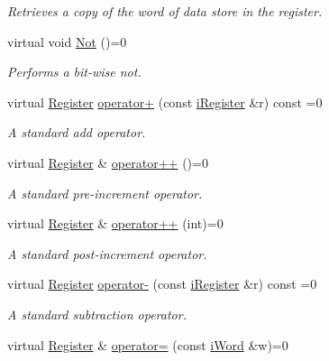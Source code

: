 \begin{DoxyCompactItemize}
\begin{DoxyCompactList}\small\item\em Retrieves a copy of the word of data store in the register. \item\end{DoxyCompactList}\item 
virtual void \hyperlink{classiRegister_af4bbbe945b151dee3f1743c43a451cb3}{Not} ()=0
\begin{DoxyCompactList}\small\item\em Performs a bit-\/wise not. \item\end{DoxyCompactList}\item 
virtual \hyperlink{classRegister}{Register} \hyperlink{classiRegister_af8ab19234f44a0bade65cb35fd2cd036}{operator+} (const \hyperlink{classiRegister}{iRegister} \&r) const =0
\begin{DoxyCompactList}\small\item\em A standard add operator. \item\end{DoxyCompactList}\item 
virtual \hyperlink{classRegister}{Register} \& \hyperlink{classiRegister_abca2bcea556d63fb4e3504df221cdc62}{operator++} ()=0
\begin{DoxyCompactList}\small\item\em A standard pre-\/increment operator. \item\end{DoxyCompactList}\item 
virtual \hyperlink{classRegister}{Register} \& \hyperlink{classiRegister_a36e6e1bfbc6a9fe203e8fb5b9f6396cb}{operator++} (int)=0
\begin{DoxyCompactList}\small\item\em A standard post-\/increment operator. \item\end{DoxyCompactList}\item 
virtual \hyperlink{classRegister}{Register} \hyperlink{classiRegister_a01f837097cb87ec33fdc1cef606e1842}{operator-\/} (const \hyperlink{classiRegister}{iRegister} \&r) const =0
\begin{DoxyCompactList}\small\item\em A standard subtraction operator. \item\end{DoxyCompactList}\item 
virtual \hyperlink{classRegister}{Register} \& \hyperlink{classiRegister_a16bf3f305a9588ddc85c109ac9a8b47b}{operator=} (const \hyperlink{classiWord}{iWord} \&w)=0

\end{DoxyCompactItemize}
